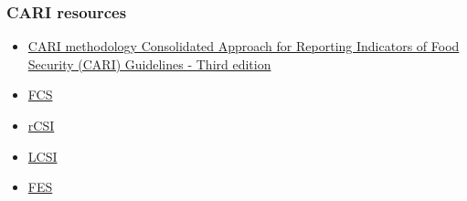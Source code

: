 \documentclass[11pt,harvard]{article}
\begin{document}
	\subsubsection{CARI resources}
	\begin{itemize}
		\item \href{https://resources.vam.wfp.org/data-analysis/quantitative/food-security/cari}{CARI methodology Consolidated Approach for Reporting Indicators of Food Security (CARI) Guidelines - Third edition}
		\item \href{https://resources.vam.wfp.org/data-analysis/quantitative/food-security/food-consumption-score}{FCS}
		\item \href{https://resources.vam.wfp.org/data-analysis/quantitative/food-security/reduced-coping-strategies-index}{rCSI}
		\item \href{https://resources.vam.wfp.org/data-analysis/quantitative/food-security/livelihood-coping-strategies-food-security}{LCSI}
		\item \href{https://resources.vam.wfp.org/data-analysis/quantitative/food-security/food-expenditure-share}{FES}
	\end{itemize} 
	
\end{document}
